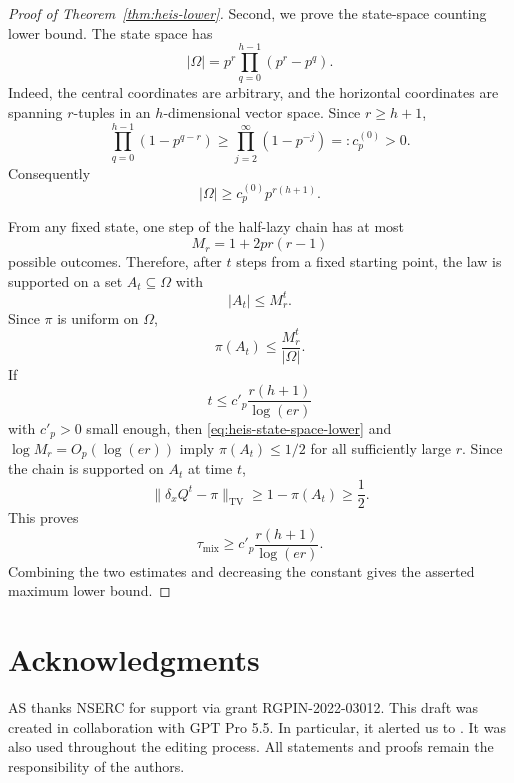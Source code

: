\documentclass[11pt, reqno]{amsart}
\numberwithin{equation}{section}
\newcommand{\TV}{\mathrm{TV}}
\begin{document}
\begin{proof}[Proof of Theorem~\ref{thm:heis-lower}]
Second, we prove the state-space counting lower bound.  The state space has
\[
    |\Omega|=p^r\prod_{q=0}^{h-1}(p^r-p^q).
\]
Indeed, the central coordinates are arbitrary, and the horizontal coordinates
are spanning \(r\)-tuples in an \(h\)-dimensional vector space.  Since
\(r\ge h+1\),
\[
    \prod_{q=0}^{h-1}(1-p^{q-r})
    \ge \prod_{j=2}^{\infty}(1-p^{-j})=:c_p^{(0)}>0.
\]
Consequently
\begin{equation}\label{eq:heis-state-space-lower}
    |\Omega|\ge c_p^{(0)}p^{r(h+1)}.
\end{equation}

From any fixed state, one step of the half-lazy chain has at most
\[
    M_r=1+2pr(r-1)
\]
possible outcomes.  Therefore, after \(t\) steps from a fixed starting point,
the law is supported on a set \(A_t\subseteq\Omega\) with
\[
    |A_t|\le M_r^t.
\]
Since \(\pi\) is uniform on \(\Omega\),
\[
    \pi(A_t)\le \frac{M_r^t}{|\Omega|}.
\]
If
\[
    t\le c'_p\frac{r(h+1)}{\log(e r)}
\]
with \(c'_p>0\) small enough, then \eqref{eq:heis-state-space-lower} and
\(\log M_r=O_p(\log(e r))\) imply \(\pi(A_t)\le1/2\) for all sufficiently large
\(r\).  Since the chain is supported on \(A_t\) at time \(t\),
\[
    \|\delta_xQ^t-\pi\|_{\TV}\ge1-\pi(A_t)\ge\frac12.
\]
This proves
\[
    \tau_{\mathrm{mix}}\ge c'_p\frac{r(h+1)}{\log(e r)}.
\]
Combining the two estimates and decreasing the constant gives the asserted
maximum lower bound.
\end{proof}

\section*{Acknowledgments}
AS thanks NSERC for support via grant RGPIN-2022-03012. This draft was created in collaboration with GPT Pro 5.5. In particular, it alerted us to \cite{Misaghian2010}. It was also used throughout the editing process. All statements and proofs remain the responsibility of the authors.



\end{document}
